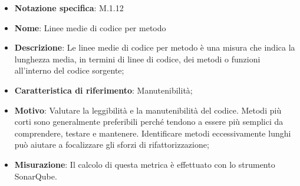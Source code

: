 \begin{itemize}
    \item \textbf{Notazione specifica}: M.1.12
    \item \textbf{Nome}: Linee medie di codice per metodo
    \item \textbf{Descrizione}: Le linee medie di codice per metodo è una misura che indica la lunghezza media, in termini di linee di codice, dei metodi o funzioni all'interno del codice sorgente;
    \item \textbf{Caratteristica di riferimento}: Manutenibilità;
    \item \textbf{Motivo}: Valutare la leggibilità e la manutenibilità del codice. Metodi più corti sono generalmente preferibili perché tendono a essere più semplici da comprendere, testare e mantenere. Identificare metodi eccessivamente lunghi può aiutare a focalizzare gli sforzi di rifattorizzazione;
    \item \textbf{Misurazione}: Il calcolo di questa metrica è effettuato con lo strumento SonarQube.
\end{itemize}
